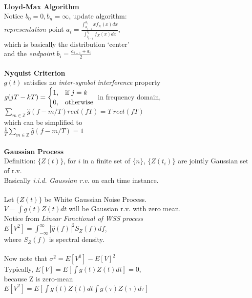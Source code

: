 \documentclass [12pt] {article}
\begin{document}
\begin{spacing}{1.5}
\begin{multicols}{2}
~\\
\textbf{Lloyd-Max Algorithm}\\
Notice $b_0 = 0, b_n = \infty$, update algorithm: \\
\emph{representation} point $a_i = \frac{\int_{b_{i-1}}^{b_i}x f_X(x)dx}{\int_{b_{i-1}}^{b_i}f_X(x)dx}$, \\
which is basically the distribution `center'\\
and the \emph{endpoint} $b_i = \frac{a_{i-1} + a_{i}}{2}$\\
~\\
\textbf{Nyquist Criterion}\\
$g(t)$ satisfies no \emph{inter-symbol interference} property\\
$ g(jT-kT)=\begin{cases}
    1, & \text{if } j=k\\
    0,              & \text{otherwise}
\end{cases}\\$
in frequency domain, \\
$ \sum_{m \in \mathbb{Z}} \hat{g}(f-m/T)rect(fT) = T \: rect(fT)$\\
which can be simplified to \\
$ \frac{1}{T} \sum_{m \in \mathbb{Z}} \hat{g}(f-m/T) = 1$\\
~\\
\textbf{Gaussian Process}\\
Definition: $\{ Z(t)\}$, for $i$ in a finite set of $\{ n \}$, $\{Z(t_i)\}$ are jointly Gaussian set of r.v.\\
Basically \emph{i.i.d. Gaussian r.v.} on each time instance.\\
~\\
Let $\{ Z(t)\}$ be White Gaussian Noise Process. \\
$V = \int g(t) Z(t) dt $ will be Gaussian r.v. with zero mean.\\
Notice from \emph{Linear Functional of WSS process}\\
$E[V^2] = \int_{-\infty}^{\infty} |\hat{g}(f)|^2 S_Z(f) df$, \\
where $S_Z(f)$ is spectral density.\\
~\\
Now note that $\sigma^2 = E[V^2] - E[V]^2$\\
Typically, $E[V] = E[\int g(t) Z(t) dt ] = 0$, \\
because Z is zero-mean\\
$E[V^2] = E[\int g(t) Z(t) dt \int g(\tau) Z(\tau) d\tau ]$\\

\end{multicols}
\end{spacing}
\end{document}
